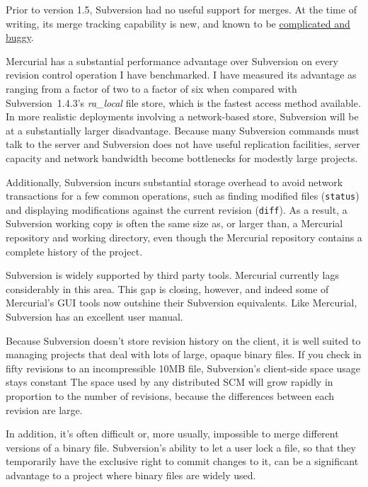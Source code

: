 Prior to version 1.5, Subversion had no useful support for merges.
At the time of writing, its merge tracking capability is new, and known to be
\href{http://svnbook.red-bean.com/nightly/en/svn.branchmerge.advanced.html#svn.branchmerge.advanced.finalword}{complicated
  and buggy}.

Mercurial has a substantial performance advantage over Subversion on
every revision control operation I have benchmarked.  I have measured
its advantage as ranging from a factor of two to a factor of six when
compared with Subversion~1.4.3's \emph{ra\_local} file store, which is
the fastest access method available.  In more realistic deployments
involving a network-based store, Subversion will be at a substantially
larger disadvantage.  Because many Subversion commands must talk to
the server and Subversion does not have useful replication facilities,
server capacity and network bandwidth become bottlenecks for modestly
large projects.

Additionally, Subversion incurs substantial storage overhead to avoid
network transactions for a few common operations, such as finding
modified files (\texttt{status}) and displaying modifications against
the current revision (\texttt{diff}).  As a result, a Subversion
working copy is often the same size as, or larger than, a Mercurial
repository and working directory, even though the Mercurial repository
contains a complete history of the project.

Subversion is widely supported by third party tools.  Mercurial
currently lags considerably in this area.  This gap is closing,
however, and indeed some of Mercurial's GUI tools now outshine their
Subversion equivalents.  Like Mercurial, Subversion has an excellent
user manual.

Because Subversion doesn't store revision history on the client, it is
well suited to managing projects that deal with lots of large, opaque
binary files.  If you check in fifty revisions to an incompressible
10MB file, Subversion's client-side space usage stays constant The
space used by any distributed SCM will grow rapidly in proportion to
the number of revisions, because the differences between each revision
are large.

In addition, it's often difficult or, more usually, impossible to
merge different versions of a binary file.  Subversion's ability to
let a user lock a file, so that they temporarily have the exclusive
right to commit changes to it, can be a significant advantage to a
project where binary files are widely used.

